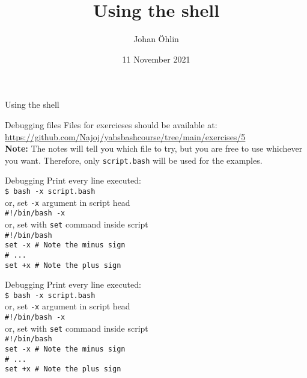 \documentclass{beamer}
\title{Using the shell}
\date{11 November 2021}
\author{Johan Öhlin}
\institute{Yabs}
\let\tt\texttt
\let\bf\textbf
\begin{document}
\begin{frame}{Using the shell}
\maketitle
\end{frame}

\begin{frame}{Debugging files}
    Files for exercieses should be available at:    \\
    \url{https://github.com/Najoj/yabsbashcourse/tree/main/exercises/5} \\
    \bf{Note:} The notes will tell you which file to try, but you are free to use whichever you want. Therefore, only \tt{script.bash} will be used for the examples.
\end{frame}

\begin{frame}{Debugging}
    Print every line executed:      \\
    \tt{\$ bash -x script.bash}     \\
    or, set \tt{-x} argument in script head \\
    \tt{\#!/bin/bash -x}            \\
    or, set with \tt{set} command inside script \\
    \tt{\#!/bin/bash}               \\
    \tt{set -x  \# Note the minus sign} \\
    \tt{\# ...}                         \\
    \tt{set +x  \# Note the plus sign}  \\
\end{frame}

\begin{frame}{Debugging}
    Print every line executed:      \\
    \tt{\$ bash -x script.bash}     \\
    or, set \tt{-x} argument in script head \\
    \tt{\#!/bin/bash -x}            \\
    or, set with \tt{set} command inside script \\
    \tt{\#!/bin/bash}               \\
    \tt{set -x  \# Note the minus sign} \\
    \tt{\# ...}                         \\
    \tt{set +x  \# Note the plus sign}  \\
\end{frame}
\end{document}
